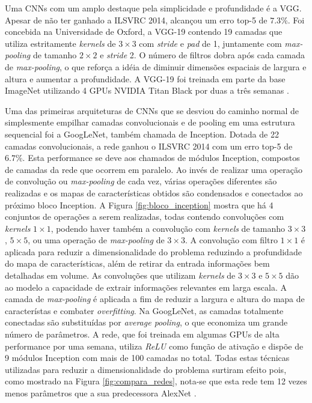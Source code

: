 Uma CNNs com um amplo destaque pela simplicidade e profundidade é a VGG. Apesar de não ter ganhado a ILSVRC 2014, alcançou um erro top-5 de $7.3\%$. Foi concebida na Universidade de Oxford, a VGG-19 contendo 19 camadas que utiliza estritamente  \emph{kernels} de $3 \times 3$ com \emph{stride} e \emph{pad} de 1, juntamente com \emph{max-pooling} de tamanho $2 \times 2$ e \emph{stride} 2. O número de filtros dobra após cada camada de \emph{max-pooling}, o que reforça a idéia de diminuir dimensões espaciais de largura e altura e aumentar a profundidade. A VGG-19 foi treinada em parte da base ImageNet utilizando 4 GPUs NVIDIA Titan Black por duas a três semanas \cite{vggnet}.

Uma das primeiras arquiteturas de CNNs que se desviou do caminho normal de simplesmente empilhar camadas convolucionais e de pooling em uma estrutura sequencial foi a GoogLeNet, também chamada de Inception. Dotada de 22 camadas convolucionais, a rede ganhou o ILSVRC 2014 com um erro top-5 de $6.7\%$. Esta performance se deve aos chamados de módulos Inception, compostos de camadas da rede que ocorrem em paralelo. Ao invés de realizar uma operação de convolução ou \emph{max-pooling} de cada vez, várias operações diferentes são realizadas e os mapas de características obtidos são condensados e conectados ao próximo bloco Inception. A Figura \ref{fig:bloco_inception} mostra que há 4 conjuntos de operações a serem realizadas, todas contendo convoluções com  \emph{kernels} $1 \times 1$, podendo haver também a convolução com \emph{kernels} de tamanho $3 \times 3$, $5 \times 5$, ou uma operação de \emph{max-pooling} de $3\times 3$. A convolução com filtro $1\times 1$ é aplicada para reduzir a dimensionalidade do problema reduzindo a profundidade do mapa de características, além de retirar da entrada informações bem detalhadas em volume. As convoluções que utilizam \emph{kernels} de $3\times 3$ e $5\times 5$ dão ao modelo a capacidade de extrair informações relevantes em larga escala. A camada de \emph{max-pooling} é aplicada a fim de reduzir a largura e altura do mapa de característas e combater \emph{overfitting}. Na GoogLeNet, as camadas totalmente conectadas são substituídas por \emph{average pooling}, o que economiza um grande número de parâmetros. A rede, que foi treinada em algumas GPUs de alta performance por uma semana, utiliza \emph{ReLU} como função de ativação e dispõe de 9 módulos Inception com mais de 100 camadas no total. Todas estas técnicas utilizadas para reduzir a dimensionalidade do problema surtiram efeito pois, como mostrado na Figura \ref{fig:compara_redes}, nota-se que esta rede tem 12 vezes menos parâmetros que a sua predecessora AlexNet \cite{inception}.


